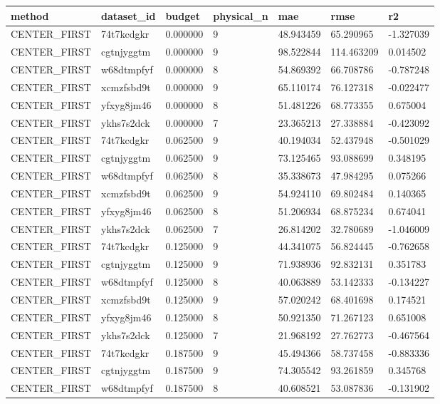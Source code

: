 \begin{tabular}{lllllll}
\hline
method & dataset\_id & budget & physical\_n & mae & rmse & r2 \\
\hline
CENTER\_FIRST & 74t7kcdgkr & 0.000000 & 9 & 48.943459 & 65.290965 & -1.327039 \\
CENTER\_FIRST & cgtnjyggtm & 0.000000 & 9 & 98.522844 & 114.463209 & 0.014502 \\
CENTER\_FIRST & w68dtmpfyf & 0.000000 & 8 & 54.869392 & 66.708786 & -0.787248 \\
CENTER\_FIRST & xcmzfsbd9t & 0.000000 & 9 & 65.110174 & 76.127318 & -0.022477 \\
CENTER\_FIRST & yfxyg8jm46 & 0.000000 & 8 & 51.481226 & 68.773355 & 0.675004 \\
CENTER\_FIRST & ykhs7s2dck & 0.000000 & 7 & 23.365213 & 27.338884 & -0.423092 \\
CENTER\_FIRST & 74t7kcdgkr & 0.062500 & 9 & 40.194034 & 52.437948 & -0.501029 \\
CENTER\_FIRST & cgtnjyggtm & 0.062500 & 9 & 73.125465 & 93.088699 & 0.348195 \\
CENTER\_FIRST & w68dtmpfyf & 0.062500 & 8 & 35.338673 & 47.984295 & 0.075266 \\
CENTER\_FIRST & xcmzfsbd9t & 0.062500 & 9 & 54.924110 & 69.802484 & 0.140365 \\
CENTER\_FIRST & yfxyg8jm46 & 0.062500 & 8 & 51.206934 & 68.875234 & 0.674041 \\
CENTER\_FIRST & ykhs7s2dck & 0.062500 & 7 & 26.814202 & 32.780689 & -1.046009 \\
CENTER\_FIRST & 74t7kcdgkr & 0.125000 & 9 & 44.341075 & 56.824445 & -0.762658 \\
CENTER\_FIRST & cgtnjyggtm & 0.125000 & 9 & 71.938936 & 92.832131 & 0.351783 \\
CENTER\_FIRST & w68dtmpfyf & 0.125000 & 8 & 40.063889 & 53.142333 & -0.134227 \\
CENTER\_FIRST & xcmzfsbd9t & 0.125000 & 9 & 57.020242 & 68.401698 & 0.174521 \\
CENTER\_FIRST & yfxyg8jm46 & 0.125000 & 8 & 50.921350 & 71.267123 & 0.651008 \\
CENTER\_FIRST & ykhs7s2dck & 0.125000 & 7 & 21.968192 & 27.762773 & -0.467564 \\
CENTER\_FIRST & 74t7kcdgkr & 0.187500 & 9 & 45.494366 & 58.737458 & -0.883336 \\
CENTER\_FIRST & cgtnjyggtm & 0.187500 & 9 & 74.305542 & 93.261859 & 0.345768 \\
CENTER\_FIRST & w68dtmpfyf & 0.187500 & 8 & 40.608521 & 53.087836 & -0.131902 \\

\end{tabular}
